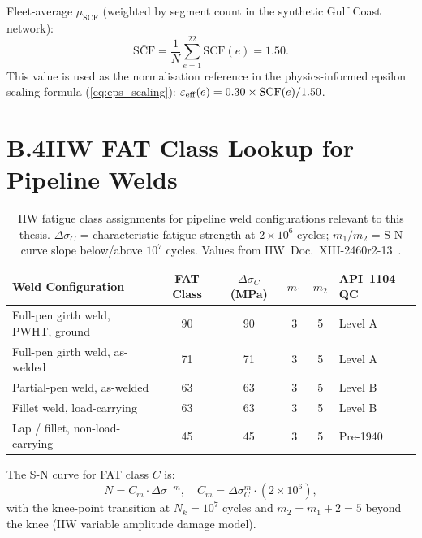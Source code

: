 \noindent Fleet-average $\mu_\mathrm{SCF}$ (weighted by segment count in
the synthetic Gulf Coast network):
\begin{equation}
  \bar{\text{SCF}} = \frac{1}{N}\sum_{e=1}^{22} \text{SCF}(e) = 1.50.
\end{equation}
This value is used as the normalisation reference in the physics-informed
epsilon scaling formula (\cref{eq:eps_scaling}):
$\varepsilon_\mathrm{eff}(e) = 0.30 \times \text{SCF}(e) / 1.50$.

\section*{B.4\quad IIW FAT Class Lookup for Pipeline Welds}

\begin{table}[htbp]
  \centering
  \caption{IIW fatigue class assignments for pipeline weld configurations
    relevant to this thesis.  $\Delta\sigma_C$ = characteristic
    fatigue strength at $2\times10^6$ cycles; $m_1 / m_2$ = S-N
    curve slope below/above $10^7$ cycles.  Values from
    IIW~Doc.~XIII-2460r2-13~\cite{IIW_Fatigue:2016}.}
  \label{tab:iiwfat}
  \begin{tabular}{@{}lccccl@{}}
    \toprule
    Weld Configuration & FAT Class &
      $\Delta\sigma_C$ (\si{\mega\pascal}) & $m_1$ & $m_2$ & API~1104 QC \\
    \midrule
    Full-pen girth weld, PWHT, ground & 90 & 90 & 3 & 5 & Level A \\
    Full-pen girth weld, as-welded & 71 & 71 & 3 & 5 & Level A \\
    Partial-pen weld, as-welded & 63 & 63 & 3 & 5 & Level B \\
    Fillet weld, load-carrying & 63 & 63 & 3 & 5 & Level B \\
    Lap / fillet, non-load-carrying & 45 & 45 & 3 & 5 & Pre-1940 \\
    \bottomrule
  \end{tabular}
\end{table}

\noindent The S-N curve for FAT class $C$ is:
\begin{equation}
  N = C_m \cdot \Delta\sigma^{-m}, \quad
  C_m = \Delta\sigma_C^m \cdot (2 \times 10^6),
\end{equation}
with the knee-point transition at $N_k = 10^7$ cycles and
$m_2 = m_1 + 2 = 5$ beyond the knee (IIW variable amplitude
damage model).

